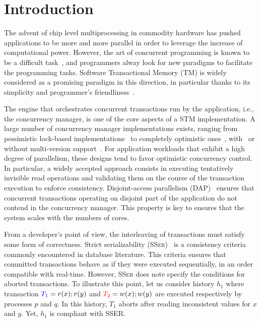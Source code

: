 \section{Introduction}

The advent of chip level multiprocessing in commodity hardware has pushed applications to be more and more parallel in order to leverage the increase of computational power.
However, the art of concurrent programming is known to be a difficult task~\cite{Lee:2006:PT:1137232.1137289}, and programmers alway look for new paradigms to facilitate the programming tasks.
Software Transactional Memory (TM) is widely considered as a promising paradigm in this direction, in particular thanks to its simplicity and programmer's friendliness~\cite{Dragojevic:2011:WSM:1924421.1924440}.

The engine that orchestrates concurrent transactions run by the application, i.e., the concurrency manager, is one of the core aspects of a STM implementation.
A large number of concurrency manager implementations exists, ranging from pessimistic lock-based implementations~\cite{harris2005revocable,afek2012pessimistic} to completely optimistic ones~\cite{hassan2014optimistic}, with~\cite{perelman2011smv} or without multi-version support~\cite{attiya2012single}.
For application workloads that exhibit a high degree of parallelism, these designs tend to favor optimistic concurrency control.
In particular, a widely accepted approach consists in executing tentatively invisible read operations and validating them on the course of the transaction execution to enforce consistency.
Disjoint-access parallelism (DAP)~\cite{ellen2012universal} ensures that concurrent transactions operating on disjoint part of the application do not contend in the concurrency manager.
This property is key to ensures that the system scales with the numbers of cores.

From a developer's point of view, the interleaving of transactions must satisfy some form of correctness.
Strict serializability (\textsc{SSer})~\cite{herlihy1990linearizability} is a consistency criteria commonly encountered in database literature.
This criteria ensures that committed transactions behave as if they were executed sequentially, in an order compatible with real-time.
However, \textsc{SSer} does note specify the conditions for aborted transactions.
To illustrate this point, let us consider history $h_1$ where transaction ${\color{blue}{T_1}}=r(x);r(y)$ and ${\color{red}{T_2}}=w(x);w(y)$ are executed respectively by processes $p$ and $q$.
In this history, $T_1$ aborts after reading inconsistent values for $x$ and $y$.
Yet, $h_1$ is compliant with SSER.


